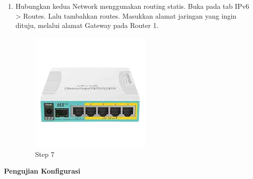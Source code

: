 \begin{enumerate}
	\item Hubungkan kedua Network menggunakan routing statis. Buka pada tab IPv6 > Routes. Lalu
	tambahkan routes. Masukkan alamat jaringan yang ingin dituju, melalui alamat Gateway pada
	Router 1.
	
	\begin{figure}[H]
		\centering
		\includegraphics[width=0.7\linewidth]{P1/img/contoh.png}
		\caption{Step 7}
		\label{fig:gambar1}
	\end{figure}

\end{enumerate}

\begin{center} 
	\textbf{Pengujian Konfigurasi}
\end{center}

